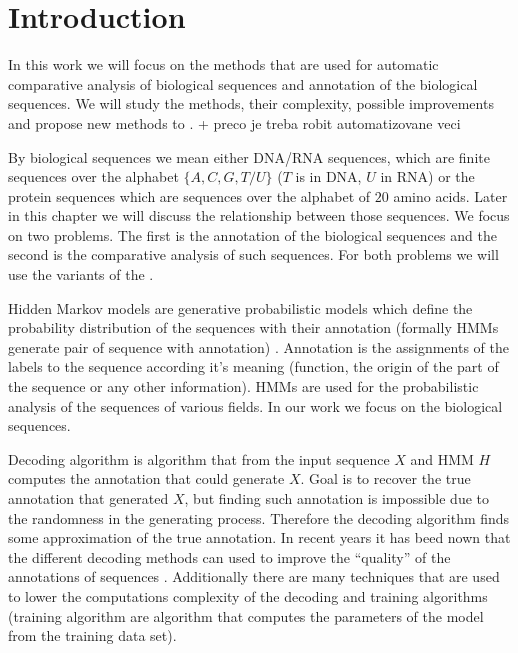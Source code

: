 \chapter{Introduction}


In this work we will focus on the methods that are used for automatic
comparative analysis of biological sequences and annotation of the biological
sequences. We will study the methods, their complexity, possible improvements
and propose new methods to . + preco je treba robit automatizovane
veci

By biological sequences we mean either DNA/RNA sequences, which are finite
sequences over the alphabet $\{A,C,G,T/U\}$ ($T$ is in DNA, $U$ in RNA) or the
protein sequences which are sequences over the alphabet of $20$ amino acids.
Later in this chapter we will discuss the relationship between those sequences.
We focus on two problems. The first is the annotation of the biological
sequences and the second is the comparative analysis of such sequences. For both 
problems we will use the variants of the .

Hidden Markov models are generative probabilistic models which define the
probability distribution of the sequences with their annotation (formally HMMs
generate pair of sequence with annotation) \cite{Durbin1998,??}. Annotation is
the assignments of the labels to the sequence according it's meaning (function,
the origin of the part of the sequence or any other information). HMMs are used
for the probabilistic analysis of the sequences of various fields. In our work
we focus on  the biological sequences. 

Decoding algorithm is algorithm that from the input sequence $X$ and HMM $H$
computes the annotation that could generate $X$. Goal is to recover the true
annotation that generated $X$, but finding such annotation is impossible due to
the randomness in the generating process. Therefore the decoding algorithm finds
some approximation of the true annotation.  In recent years it has beed nown
that the different decoding methods can used to improve the ``quality'' of the
annotations of sequences
\cite{Gross2007,Nanasi2010,Nanasi2010mgr,Truszkowski2011}.  Additionally there
are many techniques that are used to lower the computations complexity of the
decoding and training algorithms (training algorithm are algorithm that computes
the parameters of the model from the training data set).

